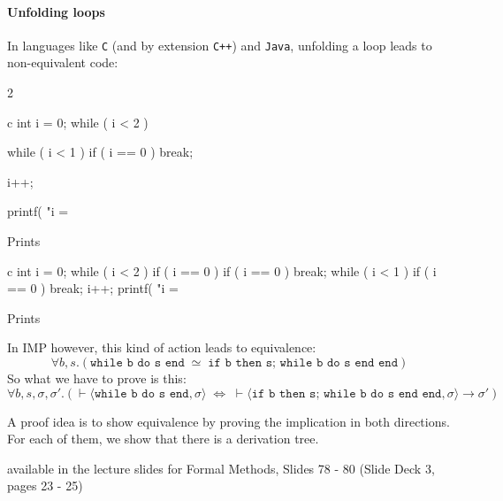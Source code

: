 \paragraph{Unfolding loops}
In languages like \texttt{C} (and by extension \texttt{C++}) and \texttt{Java}, unfolding a loop leads to non-equivalent code:

\begin{multicols}{2}
    \begin{code}{c}
        int i = 0;
        while ( i < 2 ) {


            while ( i < 1 )
                if ( i == 0 ) break;

            i++;
        }
        printf( "i = %
    \end{code}
    Prints 
    \begin{code}{c}
        int i = 0;
        while ( i < 2 ) {
            if ( i == 0 ) {
                if ( i == 0 ) break;
                while ( i < 1 )
                    if ( i == 0 ) break;
            }
            i++;
        }
        printf( "i = %
    \end{code}
    Prints 
\end{multicols}

In IMP however, this kind of action leads to equivalence:
\[
    \forall b, s.(\texttt{while b do s end} \; \simeq \; \texttt{if b then s; while b do s end end})
\]
So what we have to prove is this:
\[
    \forall b, s, \sigma, \sigma'.(\vdash \langle \texttt{while b do s end}, \sigma \rangle \; \Leftrightarrow \;
    \vdash \langle \texttt{if b then s; while b do s end end}, \sigma \rangle \rightarrow \sigma')
\]

A proof idea is to show equivalence by proving the implication in both directions. For each of them, we show that there is a derivation tree.

\inlineproof available in the lecture slides for Formal Methods, Slides 78 - 80 (Slide Deck 3, pages 23 - 25)
